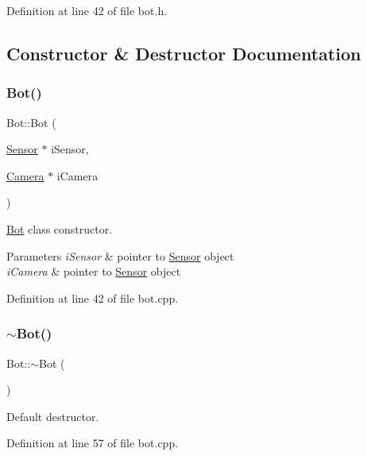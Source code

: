 Definition at line 42 of file bot.\+h.



\subsection{Constructor \& Destructor Documentation}
\mbox{\label{class_bot_a14b4bfcbda8c051d8447e73073567b50}} 
\subsubsection{\texorpdfstring{Bot()}{Bot()}}
{\footnotesize\ttfamily Bot\+::\+Bot (\begin{DoxyParamCaption}\item[{\mbox{\hyperlink{class_sensor}{Sensor}} $\ast$}]{i\+Sensor,  }\item[{\mbox{\hyperlink{class_camera}{Camera}} $\ast$}]{i\+Camera }\end{DoxyParamCaption})}



\mbox{\hyperlink{class_bot}{Bot}} class constructor. 


\begin{DoxyParams}{Parameters}
{\em i\+Sensor} & pointer to \mbox{\hyperlink{class_sensor}{Sensor}} object \\
\hline
{\em i\+Camera} & pointer to \mbox{\hyperlink{class_sensor}{Sensor}} object \\
\hline
\end{DoxyParams}


Definition at line 42 of file bot.\+cpp.

\mbox{\label{class_bot_a4163b0f6c91f94cbeb3145eeda8cd361}} 
\subsubsection{\texorpdfstring{$\sim$\+Bot()}{~Bot()}}
{\footnotesize\ttfamily Bot\+::$\sim$\+Bot (\begin{DoxyParamCaption}{ }\end{DoxyParamCaption})}



Default destructor. 



Definition at line 57 of file bot.\+cpp.



